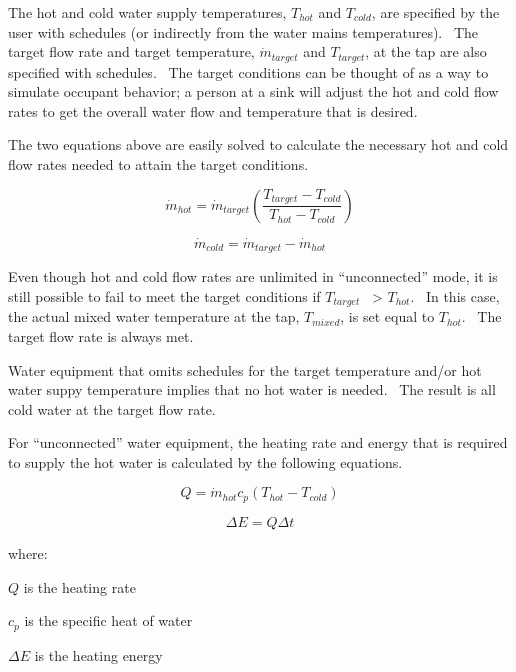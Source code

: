The hot and cold water supply temperatures, \({T_{hot}}\) and \({T_{cold}}\), are specified by the user with schedules (or indirectly from the water mains temperatures).~ The target flow rate and target temperature, \({\dot m_{target}}\) and \({T_{target}}\), at the tap are also specified with schedules.~ The target conditions can be thought of as a way to simulate occupant behavior; a person at a sink will adjust the hot and cold flow rates to get the overall water flow and temperature that is desired.

The two equations above are easily solved to calculate the necessary hot and cold flow rates needed to attain the target conditions.

\begin{equation}
{\dot m_{hot}} = {\dot m_{target}}\left( {\frac{{{T_{target}} - {T_{cold}}}}{{{T_{hot}} - {T_{cold}}}}} \right)
\end{equation}

\begin{equation}
{\dot m_{cold}} = {\dot m_{target}} - {\dot m_{hot}}
\end{equation}

Even though hot and cold flow rates are unlimited in ``unconnected'' mode, it is still possible to fail to meet the target conditions if \({T_{target}}\) ~\textgreater{} \({T_{hot}}\).~ In this case, the actual mixed water temperature at the tap, \({T_{mixed}}\), is set equal to \({T_{hot}}\).~ The target flow rate is always met.

Water equipment that omits schedules for the target temperature and/or hot water suppy temperature implies that no hot water is needed.~ The result is all cold water at the target flow rate.

For ``unconnected'' water equipment, the heating rate and energy that is required to supply the hot water is calculated by the following equations.

\begin{equation}
Q = {\dot m_{hot}}{c_p}\left( {{T_{hot}} - {T_{cold}}} \right)
\end{equation}

\begin{equation}
\Delta E = Q\Delta t
\end{equation}

where:

\(Q\) is the heating rate

\({c_p}\) is the specific heat of water

\(\Delta E\) is the heating energy

